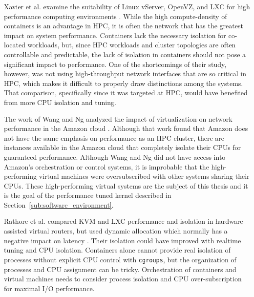 Xavier et al. examine the suitability of Linux vServer, OpenVZ, and LXC for high performance computing environments \autocite{xavier2013performance}.
While the high compute-density of containers is an advantage in HPC, it is often the network that has the greatest impact on system performance.
Containers lack the necessary isolation for co-located workloads, but, since HPC workloads and cluster topologies are often controllable and predictable, the lack of isolation in containers should not pose a significant impact to performance.
One of the shortcomings of their study, however, was not using high-throughput network interfaces that are so critical in HPC, which makes it difficult to properly draw distinctions among the systems.
That comparison, specifically since it was targeted at HPC, would have benefited from more CPU isolation and tuning.  

The work of Wang and Ng analyzed the impact of virtualization on network performance in the Amazon cloud \autocite{wangAmazon2010}.
Although that work found that Amazon does not have the same emphasis on performance as an HPC cluster, there are instances available in the Amazon cloud that completely isolate their CPUs for guaranteed performance.  
Although Wang and Ng did not have access into Amazon's orchestration or control systems, it is improbable that the high-performing virtual machines were oversubscribed with other systems sharing their CPUs. 
These high-performing virtual systems are the subject of this thesis and it is the goal of the performance tuned kernel described in Section~\ref{sub:software_environment}.  

Rathore et al. compared KVM and LXC performance and isolation in hardware-assisted virtual routers, but used dynamic allocation which normally has a negative impact on latency \autocite{rathore2013kvm}.
Their isolation could have improved with realtime tuning and CPU isolation.  
Containers alone cannot provide real isolation of processes without explicit CPU control with \texttt{cgroups}, but the organization of processes and CPU assignment can be tricky.
Orchestration of containers and virtual machines needs to consider process isolation and CPU over-subscription for maximal I/O performance.

